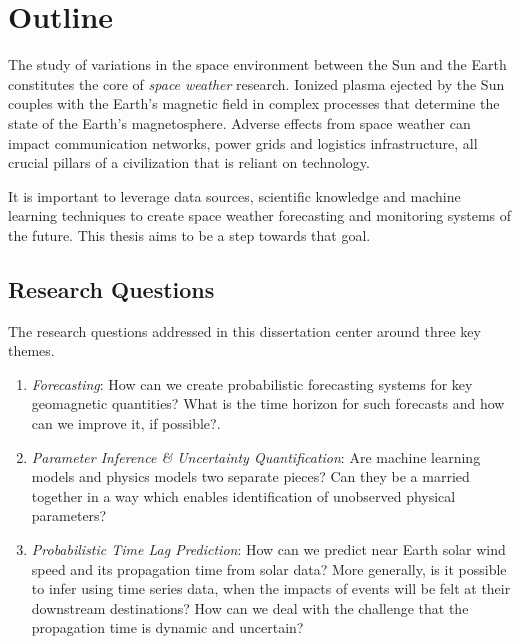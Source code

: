 \chapter{Outline}\label{chapter:Outline}

The study of variations in the space environment between the Sun and the Earth constitutes 
the core of \textit{space weather} research. Ionized plasma ejected by the Sun couples with 
the Earth’s magnetic field in complex processes that determine the state of the Earth's 
magnetosphere. Adverse effects from space weather can impact communication networks, 
power grids and logistics infrastructure, all crucial pillars of a civilization that 
is reliant on technology.

It is important to leverage data sources, scientific knowledge and machine learning 
techniques to create space weather forecasting and monitoring systems of the future. This 
thesis aims to be a step towards that goal. 

\section{Research Questions}

The research questions addressed in this dissertation center around three key themes.

\begin{enumerate}
    \item \textit{Forecasting}: How can we create probabilistic forecasting systems for key geomagnetic quantities? 
    What is the time horizon for such forecasts and how can we improve it, if possible?.
    
    \item \textit{Parameter Inference \& Uncertainty Quantification}: Are machine learning models and physics models two 
    separate pieces? Can they be a married together in a way which enables identification of unobserved physical parameters?  
    
    \item \textit{Probabilistic Time Lag Prediction}: How can we predict near Earth solar wind speed and its propagation time from solar data? 
    More generally, is it possible to infer using time series data, when the impacts of events will be felt at their downstream destinations? How 
    can we deal with the challenge that the propagation time is dynamic and uncertain?  
    
\end{enumerate}
    
